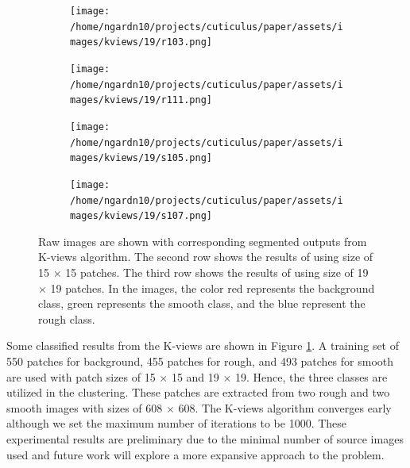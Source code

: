 \documentclass{aci}
\numberwithin{equation}{section}
\begin{document}
\begin{figure}
    \begin{subfigure}{\segmentedsubwidth}
        \texttt{[image: /home/ngardn10/projects/cuticulus/paper/assets/images/kviews/19/r103.png]}
    \end{subfigure}
    \begin{subfigure}{\segmentedsubwidth}
        \texttt{[image: /home/ngardn10/projects/cuticulus/paper/assets/images/kviews/19/r111.png]}
    \end{subfigure}
    \begin{subfigure}{\segmentedsubwidth}
        \texttt{[image: /home/ngardn10/projects/cuticulus/paper/assets/images/kviews/19/s105.png]}
    \end{subfigure}
    \begin{subfigure}{\segmentedsubwidth}
        \texttt{[image: /home/ngardn10/projects/cuticulus/paper/assets/images/kviews/19/s107.png]}
    \end{subfigure}
    \caption{Raw images are shown with corresponding segmented outputs from
        K-views algorithm. The second row shows the results of using size of 15
        $\times$ 15 patches. The third row shows the results of using size of 19
        $\times$ 19 patches. In the images, the color red represents the
        background class, green represents the smooth class, and the blue
        represent the rough class.}
    \label{fig:kviews_segmented}
\end{figure}

\FloatBarrier Some classified results from the K-views are shown in Figure
\ref{fig:kviews_segmented}. A training set of 550 patches for background, 455
patches for rough, and 493 patches for smooth are used with patch sizes of 15
$\times$ 15 and 19 $\times$ 19. Hence, the three classes are utilized in the
clustering. These patches are extracted from two rough and two smooth images
with sizes of 608 $\times$ 608. The K-views algorithm converges early although
we set the maximum number of iterations to be 1000. These experimental results
are preliminary due to the minimal number of source images used and future work
will explore a more expansive approach to the problem.

\FloatBarrier
\end{document}
